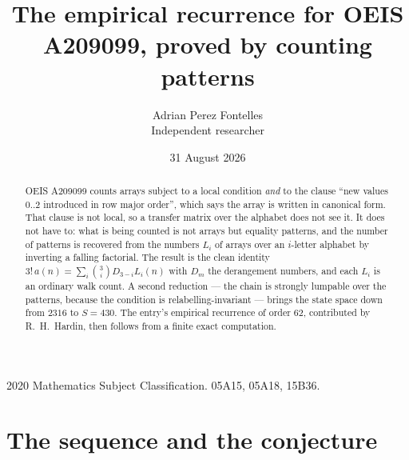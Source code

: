 \documentclass[11pt,a4paper]{article}
\title{The empirical recurrence for OEIS A209099, proved by counting patterns}
\author{Adrian Perez Fontelles\\ \small Independent researcher}
\date{31 August 2026}
\theoremstyle{plain}
\theoremstyle{definition}
\begin{document}
\maketitle

\begin{abstract}
OEIS A209099 counts arrays subject to a local condition \emph{and} to the clause ``new values
$0..2$ introduced in row major order'', which says the array is written in canonical
form. That clause is not local, so a transfer matrix over the alphabet does not see it. It
does not have to: what is being counted is not arrays but equality patterns, and the number
of patterns is recovered from the numbers $L_i$ of arrays over an $i$-letter alphabet by
inverting a falling factorial. The result is the clean identity
$3!\,a(n)=\sum_i\binom{3}{i}D_{3-i}L_i(n)$ with $D_m$ the derangement numbers,
and each $L_i$ is an ordinary walk count. A second reduction --- the chain is strongly
lumpable over the patterns, because the condition is relabelling-invariant --- brings the
state space down from $2316$ to $S=430$. The entry's empirical recurrence of order
$62$, contributed by R.~H.~Hardin, then follows from a finite exact computation.
\end{abstract}

\noindent\small 2020 Mathematics Subject Classification. 05A15, 05A18, 15B36.\normalsize

\section{The sequence and the conjecture}
\end{document}
